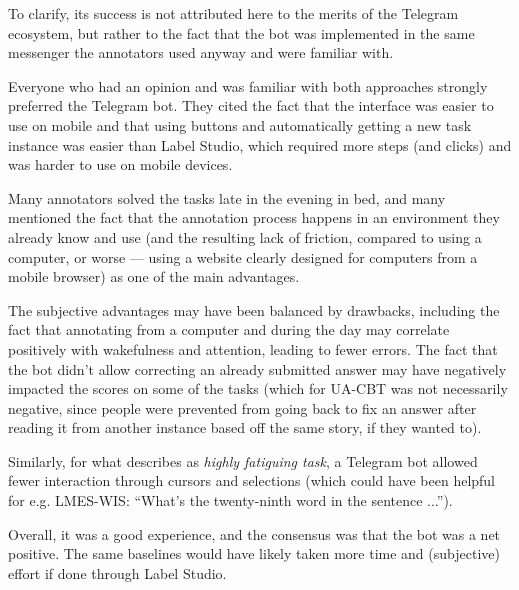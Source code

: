 To clarify, its success is not attributed here to the merits of the Telegram ecosystem, but rather to the fact that the bot was implemented in the same messenger the annotators used anyway and were familiar with.

Everyone who had an opinion and was familiar with both approaches strongly preferred the Telegram bot. They cited the fact that the interface was easier to use on mobile and that using buttons and automatically getting a new task instance was easier than Label Studio, which required more steps (and clicks) and was harder to use on mobile devices.

Many annotators solved the tasks late in the evening in bed, and many mentioned the fact that the annotation process happens in an environment they already know and use (and the resulting lack of friction, compared to using a computer, or worse — using a website clearly designed for computers from a mobile browser) as one of the main advantages.

The subjective advantages may have been balanced by drawbacks, including the fact that annotating from a computer and during the day may correlate positively with wakefulness and attention, leading to fewer errors. The fact that the bot didn't allow correcting an already submitted answer may have negatively impacted the scores on some of the tasks (which for UA-CBT was not necessarily negative, since people were prevented from going back to fix an answer after reading it from another instance based off the same story, if they wanted to).

Similarly, for what \cite{cowley_framework_2022} describes as \textit{highly fatiguing task}, a Telegram bot allowed fewer interaction through cursors and selections (which could have been helpful for e.g. LMES-WIS: \enquote{What's the twenty-ninth word in the sentence ...}).

Overall, it was a good experience, and the consensus was that the bot was a net positive. The same baselines would have likely taken more time and (subjective) effort if done through Label Studio.


